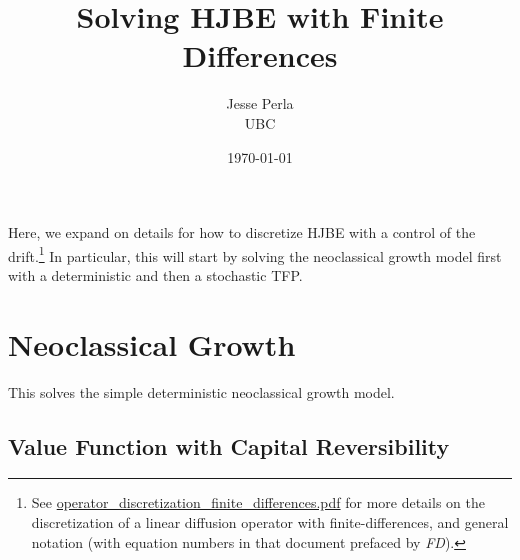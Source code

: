 \documentclass[11pt]{etk-article}
\begin{document}
\title{Solving HJBE with Finite Differences}
\author{Jesse Perla\\UBC}
\date{\today}
\maketitle
 Here, we expand on details for how to discretize HJBE with a control of the drift.\footnote{See \url{operator_discretization_finite_differences.pdf} for more details on the discretization of a linear diffusion operator with finite-differences, and general notation (with equation numbers in that document prefaced by \textit{FD}).}  In particular, this will start by solving the neoclassical growth model first with a deterministic and then a stochastic TFP.
 
 \section{Neoclassical Growth}
 This solves the simple deterministic neoclassical growth model.
 \subsection{Value Function with Capital Reversibility}
 
\end{document}
